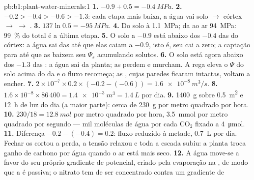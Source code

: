 \begin{solution}{pb:b1:plant-water-minerals:1}
\textbf{1.} $-0.9 + 0.5 = \qty{-0.4}{MPa}$.
\textbf{2.} $-0.2 > -0.4 > -0.6 > -1.3$: cada etapa mais baixa, a água
vai solo $\to$ córtex $\to$  $\to$ .
\textbf{3.} $137\ln 0.5 = \qty{-95}{MPa}$.
\textbf{4.} Do solo à  \qty{1.1}{MPa}; da  ao ar
\qty{94}{MPa}: \qty{99}{\%} do total é a última etapa.
\textbf{5.} O solo a $-0.9$ está abaixo dos $-0.4$ das  do
córtex: a água sai das  até que elas caiam a $-0.9$, isto é,
seu  cai a zero; a captação para até que as  baixem
seu $\Psi_s$ acumulando solutos.
\textbf{6.} O solo está agora abaixo dos $-1.3$ das : a água sai
da planta; as  perdem  e murcham. A rega eleva o
$\Psi$ do solo acima do da  e o fluxo recomeça; as , cujas
paredes ficaram intactas, voltam a encher.
\textbf{7.} $2\times 10^{-7}\times 0.2\times(-0.2 - (-0.6)) =
\qty{1.6e-8}{m^3/s}$.
\textbf{8.} $1.6\times 10^{-8}\times 86\,400 = \qty{1.4e-3}{m^3} =
\qty{1.4}{L}$ por dia.
\textbf{9.} \qty{1400}{g} sobre \qty{0.5}{m^2} e \qty{12}{h} de luz do
dia (a maior parte): cerca de \qty{230}{g} por metro quadrado por hora.
\textbf{10.} $230/18 = \qty{12.8}{mol}$ por metro quadrado por hora, \qty{3.5}{mmol} por metro quadrado por segundo --- mil moléculas de água por cada $\mathrm{CO_2}$ fixado a \qty{4}{\micro mol}.
\textbf{11.} Diferença $-0.2 - (-0.4) = 0.2$: fluxo reduzido à metade,
\qty{0.7}{L} por dia. Fechar os  cortou a perda, a tensão
relaxou e toda a escada subiu: a planta troca ganho de carbono por
água quando o ar está mais seco.
\textbf{12.} A água move-se a favor do seu próprio gradiente de
potencial, criado pela evaporação na , de modo que a  é
passiva; o nitrato tem de ser concentrado contra um gradiente de

\end{solution}
